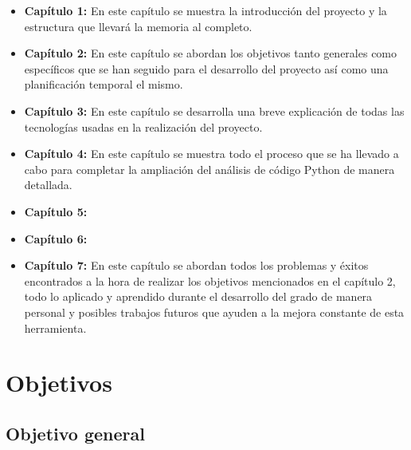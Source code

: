 \documentclass[a4paper, 12pt]{book}
\begin{document}
\begin{itemize}
  \item \textbf{Capítulo 1:} En este capítulo se muestra la introducción del proyecto y la estructura que llevará la memoria al completo.
  
  \item \textbf{Capítulo 2:} En este capítulo se abordan los objetivos tanto generales como específicos que se han seguido para el desarrollo del proyecto así como una planificación temporal el mismo.
  
  \item \textbf{Capítulo 3:} En este capítulo se desarrolla una breve explicación de todas las tecnologías usadas en la realización del proyecto.
  
  \item \textbf{Capítulo 4:} En este capítulo se muestra todo el proceso que se ha llevado a cabo para completar la ampliación del análisis de código Python de manera detallada.
  
  \item \textbf{Capítulo 5:}
  
  \item \textbf{Capítulo 6:}
  
  \item \textbf{Capítulo 7:} En este capítulo se abordan todos los problemas y éxitos encontrados a la hora de realizar los objetivos mencionados en el capítulo 2, todo lo aplicado y aprendido durante el desarrollo del grado de manera personal y posibles trabajos futuros que ayuden a la mejora constante de esta herramienta.
\end{itemize}




\cleardoublepage %
\chapter{Objetivos} %
\label{chap:objetivos} %

\section{Objetivo general} %
\label{sec:objetivo-general} %
\end{document}
